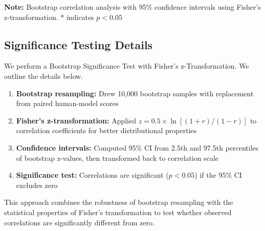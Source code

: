 \documentclass[11pt]{article}
\begin{document}
\textbf{Note:} Bootstrap correlation analysis with 95\% confidence intervals using Fisher's z-transformation. * indicates $p < 0.05$

\subsection{Significance Testing Details}

We perform a Bootstrap Significance Test with Fisher's z-Transformation. We outline the details below.

\begin{enumerate}
    \item \textbf{Bootstrap resampling:} Drew 10,000 bootstrap samples with replacement from paired human-model scores
    \item \textbf{Fisher's z-transformation:} Applied $z = 0.5 \times \ln[(1+r)/(1-r)]$ to correlation coefficients for better distributional properties
    \item \textbf{Confidence intervals:} Computed 95\% CI from 2.5th and 97.5th percentiles of bootstrap z-values, then transformed back to correlation scale
    \item \textbf{Significance test:} Correlations are significant ($p < 0.05$) if the 95\% CI excludes zero
\end{enumerate}

This approach combines the robustness of bootstrap resampling with the statistical properties of Fisher's transformation to test whether observed correlations are significantly different from zero.
\end{document}
